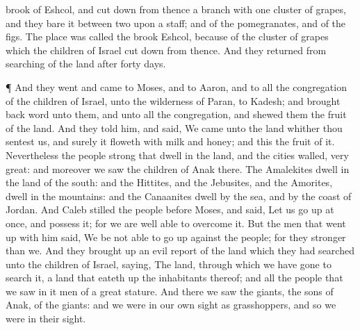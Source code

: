 {brook of
Eshcol, and cut
down from thence a
branch with
one
cluster of
grapes, and they
bare it between
two upon a
staff; and
{} of the
pomegranates, and of the
figs.
The
place was
called the
brook
Eshcol, because
of the cluster of
grapes which the
children of
Israel cut
down from thence.
And they
returned from
searching of the
land
after
forty
days.
\par }{\PP {}¶ And they
went and
came to
Moses, and to
Aaron, and to all the
congregation of the
children of
Israel, unto the
wilderness of
Paran, to
Kadesh; and brought
back
word unto them, and unto all the
congregation, and
shewed them the
fruit of the
land.
And they
told him, and
said, We
came unto the
land whither thou
sentest us, and surely it
floweth with
milk and
honey; and this
{} the
fruit of it.
Nevertheless the
people
{}
strong that
dwell in the
land, and the
cities
{}
walled,
{}
very
great: and moreover we
saw the
children of
Anak there.
The
Amalekites
dwell in the
land of the
south: and the
Hittites, and the
Jebusites, and the
Amorites,
dwell in the
mountains: and the
Canaanites
dwell by the
sea, and by the
coast of
Jordan.
And
Caleb
stilled the
people before
Moses, and
said, Let us go
up at
once, and
possess it; for we are well
able to
overcome it.
But the
men that went
up with him
said, We be not
able to go
up against the
people; for they
{}
stronger than we.
And they brought
up an evil
report of the
land which they had
searched unto the
children of
Israel,
saying, The
land, through which we have
gone to
search it,
{} a
land that eateth
up the
inhabitants thereof; and all the
people that we
saw in
it
{}
men of a great
stature.
And there we
saw the
giants, the
sons of
Anak,
{} of the
giants: and we were in our own
sight as
grasshoppers, and so we were in their
sight.

}
